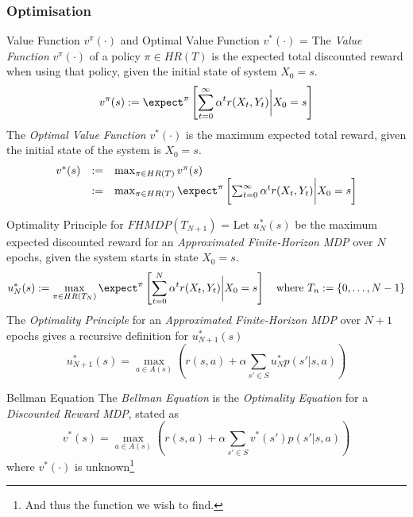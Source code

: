 \documentclass[11pt,a4paper]{article}
\begin{document}
\subsubsection{Optimisation}

  \begin{definition}{Value Function $v^\pi(\cdot)$ and Optimal Value Function $v^*(\cdot)$}
    \everymath={\displaystyle}
    The \textit{Value Function} $v^\pi(\cdot)$ of a policy $\pi\in HR(T)$ is the expected total discounted reward when using that policy, given the initial state of system $X_0=s$.
    \[ v^\pi(s):=\expect^\pi\left[\sum_{t=0}^\infty\alpha^tr(X_t,Y_t)\bigg|X_0=s\right] \]
    The \textit{Optimal Value Function} $v^*(\cdot)$ is the maximum expected total reward, given the initial state of the system is $X_0=s$.
    \[\begin{array}{rcl}
      v^*(s)&:=&\max_{\pi\in HR(T)}v^\pi(s)\\
      &:=&\max_{\pi\in HR(T)}\expect^\pi\left[\sum_{t=0}^\infty\alpha^tr(X_t,Y_t)\bigg|X_0=s\right]
    \end{array}\]
  \end{definition}

  \begin{theorem}{Optimality Principle for $FHMDP(T_{N+1})$}
    \everymath={\displaystyle}
    Let $u_N^*(s)$ be the maximum expected discounted reward for an \textit{Approximated Finite-Horizon MDP} over $N$ epochs, given the system starts in state $X_0=s$.
    \[ u_N^*(s):=\max_{\pi\in HR(T_N)}\expect^\pi\left[\sum_{t=0}^N\alpha^tr(X_t,Y_t)\bigg|X_0=s\right]\quad\text{where }T_n:=\{0,\dots,N-1\} \]
    The \textit{Optimality Principle} for an \textit{Approximated Finite-Horizon MDP} over $N+1$ epochs gives a recursive definition for $u_{N+1}^*(s)$
    \[ u_{N+1}^*(s)=\max_{a\in A(s)}\left(r(s,a)+\alpha\sum_{s'\in S}u_N^*p(s'|s,a)\right) \]
  \end{theorem}

  \begin{definition}{Bellman Equation}
    The \textit{Bellman Equation} is the \textit{Optimality Equation} for a \textit{Discounted Reward MDP}, stated as
    \[ v^*(s)=\max_{a\in A(s)}\left(r(s,a)+\alpha\sum_{s'\in S}v^*(s')p(s'|s,a)\right) \]
    where $v^*(\cdot)$ is unknown\footnote{And thus the function we wish to find.}
  \end{definition}
\end{document}
